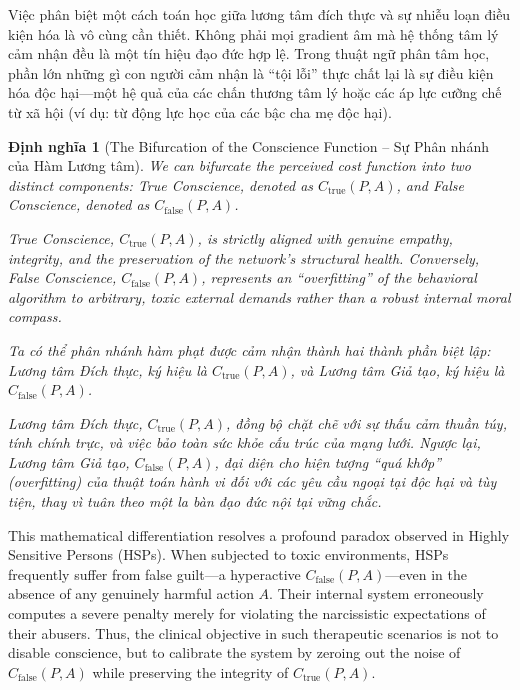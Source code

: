 \documentclass{report}
\newtheorem{dinhnghia}{Định nghĩa}
\begin{document}
Việc phân biệt một cách toán học giữa lương tâm đích thực và sự nhiễu loạn điều kiện hóa là vô cùng cần thiết. Không phải mọi gradient âm mà hệ thống tâm lý cảm nhận đều là một tín hiệu đạo đức hợp lệ. Trong thuật ngữ phân tâm học, phần lớn những gì con người cảm nhận là ``tội lỗi'' thực chất lại là sự điều kiện hóa độc hại—một hệ quả của các chấn thương tâm lý hoặc các áp lực cưỡng chế từ xã hội (ví dụ: từ động lực học của các bậc cha mẹ độc hại).

\begin{dinhnghia}[The Bifurcation of the Conscience Function -- Sự Phân nhánh của Hàm Lương tâm]
	We can bifurcate the perceived cost function into two distinct components: True Conscience, denoted as $C_{\text{true}}(P,A)$, and False Conscience, denoted as $C_{\text{false}}(P,A)$.
	
	True Conscience, $C_{\text{true}}(P,A)$, is strictly aligned with genuine empathy, integrity, and the preservation of the network's structural health. Conversely, False Conscience, $C_{\text{false}}(P,A)$, represents an ``overfitting'' of the behavioral algorithm to arbitrary, toxic external demands rather than a robust internal moral compass.
	
	Ta có thể phân nhánh hàm phạt được cảm nhận thành hai thành phần biệt lập: Lương tâm Đích thực, ký hiệu là $C_{\text{true}}(P,A)$, và Lương tâm Giả tạo, ký hiệu là $C_{\text{false}}(P,A)$.
	
	Lương tâm Đích thực, $C_{\text{true}}(P,A)$, đồng bộ chặt chẽ với sự thấu cảm thuần túy, tính chính trực, và việc bảo toàn sức khỏe cấu trúc của mạng lưới. Ngược lại, Lương tâm Giả tạo, $C_{\text{false}}(P,A)$, đại diện cho hiện tượng ``quá khớp'' (overfitting) của thuật toán hành vi đối với các yêu cầu ngoại tại độc hại và tùy tiện, thay vì tuân theo một la bàn đạo đức nội tại vững chắc.
\end{dinhnghia}

This mathematical differentiation resolves a profound paradox observed in Highly Sensitive Persons (HSPs). When subjected to toxic environments, HSPs frequently suffer from false guilt—a hyperactive $C_{\text{false}}(P,A)$—even in the absence of any genuinely harmful action $A$. Their internal system erroneously computes a severe penalty merely for violating the narcissistic expectations of their abusers. Thus, the clinical objective in such therapeutic scenarios is not to disable conscience, but to calibrate the system by zeroing out the noise of $C_{\text{false}}(P,A)$ while preserving the integrity of $C_{\text{true}}(P,A)$.
\end{document}
